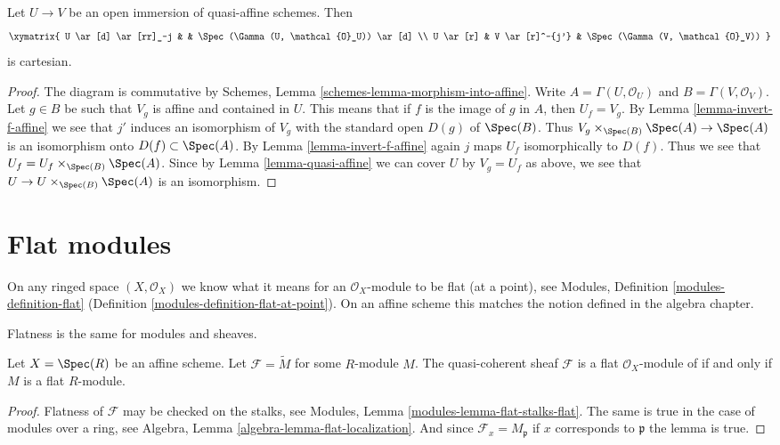 \begin{lemma}
\label{lemma-cartesian-diagram-quasi-affine}
Let $U \to V$ be an open immersion of quasi-affine schemes. Then
$$
\xymatrix{
U \ar[d] \ar[rr]_-j & & \Spec(\Gamma(U, \mathcal{O}_U)) \ar[d] \\
U \ar[r] & V \ar[r]^-{j'} & \Spec(\Gamma(V, \mathcal{O}_V))
}
$$
is cartesian.
\end{lemma}

\begin{proof}
The diagram is commutative by Schemes, Lemma
\ref{schemes-lemma-morphism-into-affine}.
Write $A = \Gamma(U, \mathcal{O}_U)$ and $B = \Gamma(V, \mathcal{O}_V)$. Let
$g \in B$ be such that $V_g$ is affine and contained in $U$. This
means that if $f$ is the image of $g$ in $A$, then $U_f = V_g$. By Lemma
\ref{lemma-invert-f-affine} we see that $j'$ induces an isomorphism of
$V_g$ with the standard open $D(g)$ of $\Spec(B)$. Thus
$V_g \times_{\Spec(B)} \Spec(A) \to \Spec(A)$ is an
isomorphism onto $D(f) \subset \Spec(A)$. By Lemma \ref{lemma-invert-f-affine}
again $j$ maps $U_f$ isomorphically to $D(f)$. Thus we see that
$U_f = U_f \times_{\Spec(B)} \Spec(A)$. Since by
Lemma \ref{lemma-quasi-affine} we can cover $U$ by $V_g = U_f$ as above,
we see that $U \to U \times_{\Spec(B)} \Spec(A)$ is an isomorphism.
\end{proof}



\section{Flat modules}
\label{section-flat}

\noindent
On any ringed space $(X, \mathcal{O}_X)$
we know what it means for an $\mathcal{O}_X$-module
to be flat (at a point), see
Modules, Definition \ref{modules-definition-flat}
(Definition \ref{modules-definition-flat-at-point}).
On an affine scheme this matches the notion
defined in the algebra chapter.

\begin{lemma}
\label{lemma-flat-module}
\begin{slogan}
Flatness is the same for modules and sheaves.
\end{slogan}
Let $X = \Spec(R)$ be an affine scheme.
Let $\mathcal{F} = \widetilde{M}$ for some $R$-module $M$.
The quasi-coherent sheaf $\mathcal{F}$ is a flat
$\mathcal{O}_X$-module of if and only if $M$ is a flat $R$-module.
\end{lemma}

\begin{proof}
Flatness of $\mathcal{F}$ may be checked on the stalks, see
Modules, Lemma \ref{modules-lemma-flat-stalks-flat}.
The same is true in the case of modules over a ring, see
Algebra, Lemma \ref{algebra-lemma-flat-localization}.
And since $\mathcal{F}_x = M_{\mathfrak p}$ if $x$ corresponds
to $\mathfrak p$ the lemma is true.
\end{proof}





